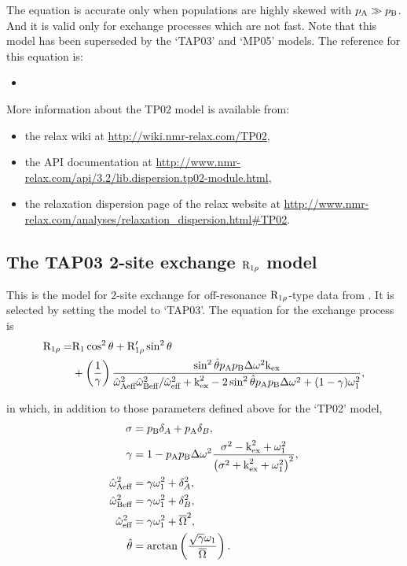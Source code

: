 The equation is accurate only when populations are highly skewed with $p_{\textrm{A}} \gg p_{\textrm{B}}$.
And it is valid only for exchange processes which are not fast.
Note that this model has been superseded by the `TAP03' and `MP05' models.
The reference for this equation is:
\begin{itemize}
  \item {}
\end{itemize}

More information about the TP02 model is available from:
\begin{itemize}
  \item the relax wiki at \url{http://wiki.nmr-relax.com/TP02},
  \item the API documentation at \url{http://www.nmr-relax.com/api/3.2/lib.dispersion.tp02-module.html},
  \item the relaxation dispersion page of the relax website at \url{http://www.nmr-relax.com/analyses/relaxation\_dispersion.html#TP02}.
\end{itemize}



\subsection{The TAP03 2-site exchange $\mathrm{R}_{1\rho}$ model}
\label{sect: dispersion: TAP03 model}

This is the model for 2-site exchange for off-resonance $\mathrm{R}_{1\rho}$-type data from \citet{Trott03}.
It is selected by setting the model to `TAP03'.
The equation for the exchange process is
\begin{align}
    \mathrm{R}_{1\rho} = & \mathrm{R}_1\cos^2\theta + \mathrm{R}_{1\rho}'\sin^2\theta \nonumber \\
               & + \left( \frac{1}{\gamma} \right) 
                        \frac{\sin^2\hat\theta p_{\textrm{A}}p_{\textrm{B}}\Delta\omega^2\textrm{k}_{\textrm{ex}}}{\hat\omega_{\textrm{Aeff}}^2\hat\omega_{\textrm{Beff}}^2/\hat\omega_{\textrm{eff}}^2 + \textrm{k}_{\textrm{ex}}^2 - 2\sin^2\hat\theta p_{\textrm{A}}p_{\textrm{B}}\Delta\omega^2 + (1 - \gamma)\omega_1^2},
\end{align}

in which, in addition to those parameters defined above for the `TP02' model,
\begin{subequations}
\begin{align}
    \sigma &= p_{\textrm{B}}\delta_A + p_{\textrm{A}}\delta_B, \\
    \gamma &= 1 - p_{\textrm{A}}p_{\textrm{B}}\Delta\omega^2 \frac{\sigma^2 - \textrm{k}_{\textrm{ex}}^2 + \omega_1^2}{\left( \sigma^2 + \textrm{k}_{\textrm{ex}}^2 + \omega_1^2 \right)^2}, \\
    \hat\omega_{\textrm{Aeff}}^2 &= \gamma\omega_1^2 + \delta_A^2, \\
    \hat\omega_{\textrm{Beff}}^2 &= \gamma\omega_1^2 + \delta_B^2, \\
    \hat\omega_{\textrm{eff}}^2 &= \gamma\omega_1^2 + \overline{\Omega}^2, \\
    \hat\theta &= \arctan \left( \frac{\sqrt{\gamma}\omega_1}{\overline{\Omega}} \right).
\end{align}
\end{subequations}

